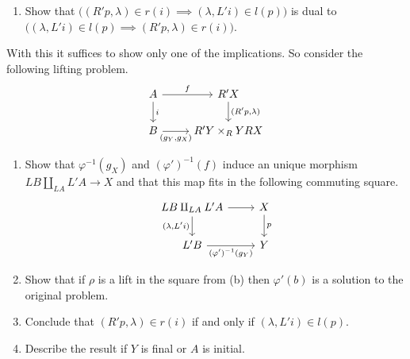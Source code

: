 \begin{Exercise}
\begin{enumerate}[label=(\alph*)]
    \item 
    Show that $ \big( ( R'p , \lambda ) \in r ( i ) \implies ( \lambda , L' i ) \in l ( p ) \big) $ is dual to $ \big( ( \lambda , L'i ) \in l ( p ) \implies ( R'p , \lambda ) \in r ( i ) \big)$.
\end{enumerate}

With this it suffices to show only one of the implications. 
So consider the following lifting problem.
\[
\begin{tikzcd}
    A 
    \ar[r, "f"]
    \ar[d, "i"]
    &
    R'X
    \ar[d, "{(R'p , \lambda)} "]
    \\
    B
    \ar[r, "{(g_Y , g_X)}"']
    &
    R'Y \times_RY RX
\end{tikzcd}
\]

\begin{enumerate}[label=(\alph*), resume]
    \item 
    Show that $ \varphi^{-1} ( g_X ) $ and $ ( \varphi' )^{ - 1 } ( f ) $ induce an unique morphism $ LB \amalg_{LA} L'A \to X $ and that this map fits in the following commuting square.
    \[
    \begin{tikzcd}
        LB \amalg_{LA} L'A 
        \rar
        \ar[d, "{ (\lambda , L' i ) }"']
        &
        X
        \ar[d, "p"]
        \\
        L'B 
        \ar[r, "{(\varphi')^{-1} (g_Y)}"']
        &
        Y
    \end{tikzcd}
    \]

    \item 
    Show that if $ \rho $ is a lift in the square from (b) then $ \varphi' ( b ) $ is a solution to the original problem.

    \item 
    Conclude that $ ( R'p , \lambda ) \in r(i) $ if and only if $ ( \lambda , L'i) \in l ( p ) $.

    \item 
    Describe the result if $ Y $ is final or $ A $ is initial.
\end{enumerate}

\end{Exercise}

